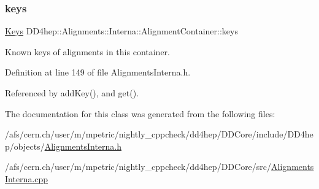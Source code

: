 \subsubsection{\texorpdfstring{keys}{keys}}
{\footnotesize\ttfamily \hyperlink{class_d_d4hep_1_1_alignments_1_1_interna_1_1_alignment_container_a3fc62784c22ba44d9ac63c424ec55799}{Keys} D\+D4hep\+::\+Alignments\+::\+Interna\+::\+Alignment\+Container\+::keys}



Known keys of alignments in this container. 



Definition at line 149 of file Alignments\+Interna.\+h.



Referenced by add\+Key(), and get().



The documentation for this class was generated from the following files\+:\begin{DoxyCompactItemize}
\item 
/afs/cern.\+ch/user/m/mpetric/nightly\+\_\+cppcheck/dd4hep/\+D\+D\+Core/include/\+D\+D4hep/objects/\hyperlink{_alignments_interna_8h}{Alignments\+Interna.\+h}\item 
/afs/cern.\+ch/user/m/mpetric/nightly\+\_\+cppcheck/dd4hep/\+D\+D\+Core/src/\hyperlink{_alignments_interna_8cpp}{Alignments\+Interna.\+cpp}\end{DoxyCompactItemize}
